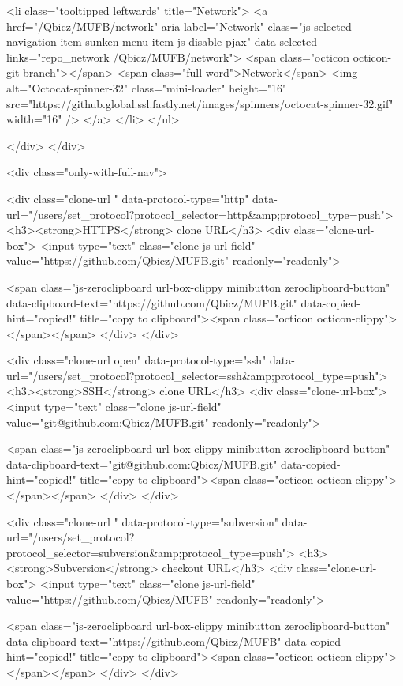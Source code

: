       <li class="tooltipped leftwards" title="Network">
        <a href="/Qbicz/MUFB/network" aria-label="Network" class="js-selected-navigation-item sunken-menu-item js-disable-pjax" data-selected-links="repo_network /Qbicz/MUFB/network">
          <span class="octicon octicon-git-branch"></span> <span class="full-word">Network</span>
          <img alt="Octocat-spinner-32" class="mini-loader" height="16" src="https://github.global.ssl.fastly.net/images/spinners/octocat-spinner-32.gif" width="16" />
</a>      </li>
    </ul>


  </div>
</div>

            <div class="only-with-full-nav">
              

  

<div class="clone-url "
  data-protocol-type="http"
  data-url="/users/set_protocol?protocol_selector=http&amp;protocol_type=push">
  <h3><strong>HTTPS</strong> clone URL</h3>
  <div class="clone-url-box">
    <input type="text" class="clone js-url-field"
           value="https://github.com/Qbicz/MUFB.git" readonly="readonly">

    <span class="js-zeroclipboard url-box-clippy minibutton zeroclipboard-button" data-clipboard-text="https://github.com/Qbicz/MUFB.git" data-copied-hint="copied!" title="copy to clipboard"><span class="octicon octicon-clippy"></span></span>
  </div>
</div>

  

<div class="clone-url open"
  data-protocol-type="ssh"
  data-url="/users/set_protocol?protocol_selector=ssh&amp;protocol_type=push">
  <h3><strong>SSH</strong> clone URL</h3>
  <div class="clone-url-box">
    <input type="text" class="clone js-url-field"
           value="git@github.com:Qbicz/MUFB.git" readonly="readonly">

    <span class="js-zeroclipboard url-box-clippy minibutton zeroclipboard-button" data-clipboard-text="git@github.com:Qbicz/MUFB.git" data-copied-hint="copied!" title="copy to clipboard"><span class="octicon octicon-clippy"></span></span>
  </div>
</div>

  

<div class="clone-url "
  data-protocol-type="subversion"
  data-url="/users/set_protocol?protocol_selector=subversion&amp;protocol_type=push">
  <h3><strong>Subversion</strong> checkout URL</h3>
  <div class="clone-url-box">
    <input type="text" class="clone js-url-field"
           value="https://github.com/Qbicz/MUFB" readonly="readonly">

    <span class="js-zeroclipboard url-box-clippy minibutton zeroclipboard-button" data-clipboard-text="https://github.com/Qbicz/MUFB" data-copied-hint="copied!" title="copy to clipboard"><span class="octicon octicon-clippy"></span></span>
  </div>
</div>


